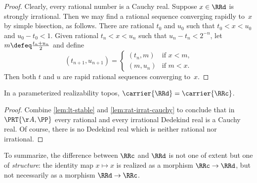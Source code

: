 \begin{proof}
  Clearly, every rational number is a Cauchy real.
  Suppose $x \in \RRd$ is strongly irrational. Then we may find a rational sequence converging rapidly to~$x$ by simple bisection, as follows. There are rational $t_0$ and $u_0$ such that $t_0 < x < u_0$ and $u_0 - t_0 < 1$.
  Given rational $t_n < x < u_n$ such that $u_n - t_n < 2^{-n}$, let $m \defeq \frac{t_n + u_n}{2}$ and define
  \begin{equation*}
    (t_{n+1}, u_{n+1}) =
    \begin{cases}
      (t_n, m) & \text{if $x < m$,} \\
      (m, u_n) & \text{if $m < x$.}
    \end{cases}
  \end{equation*}
  Then both $t$ and $u$ are rapid rational sequences converging to~$x$.
\end{proof}

\begin{proposition}
  \label{prop:carrier-Rd-eq-Rc}%
  In a parameterized realizability topos, $\carrier{\RRd} = \carrier{\RRc}$.
\end{proposition}

\begin{proof}
  Combine \cref{lem:lt-stable} and \cref{lem:rat-irrat-cauchy} to conclude that
  in $\PRT{\AA, \PP}$ every rational and every irrational Dedekind real is a Cauchy real.
  Of course, there is no Dedekind real which is neither rational nor irrational.
\end{proof}

To summarize, the difference between $\RRc$ and $\RRd$ is not one of extent but one of \emph{structure}:
the identity map $x \mapsto x$ is realized as a morphism $\RRc \to \RRd$, but not necessarily as a morphism $\RRd \to \RRc$.


 